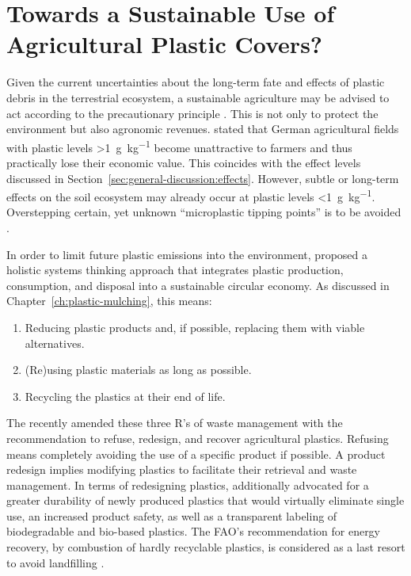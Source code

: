 \section{Towards a Sustainable Use of Agricultural Plastic Covers?}
\label{sec:general-discussion:sustainable}

Given the current uncertainties about the long-term fate and effects of plastic debris in the terrestrial ecosystem, a sustainable agriculture may be advised to act according to the precautionary principle \citep{RhodesPlastic2018,BackhausMicroplastics2020,MollerFinding2020}. This is not only to protect the environment but also agronomic revenues.  stated that German agricultural fields with plastic levels \SI{>1}{\gram\per\kilo\gram} become unattractive to farmers and thus practically lose their economic value. This coincides with the effect levels discussed in Section~\ref{sec:general-discussion:effects}. However, subtle or long-term effects on the soil ecosystem may already occur at plastic levels \SI{<1}{\gram\per\kilo\gram}. Overstepping certain, yet unknown ``microplastic tipping points'' is to be avoided \citep{QiBehavior2020}.

In order to limit future plastic emissions into the environment, \citet{ThompsonPlastics2009,ScalengheResource2018,RhodesPlastic2018} proposed a holistic systems thinking approach that integrates plastic production, consumption, and disposal into a sustainable circular economy. As discussed in Chapter~\ref{ch:plastic-mulching}, this means:
\begin{enumerate}
	\item Reducing plastic products and, if possible, replacing them with viable alternatives.
	\item (Re)using plastic materials as long as possible.
	\item Recycling the plastics at their end of life.
\end{enumerate}

The \citet{FAOAssessment2021} recently amended these three R's of waste management with the recommendation to refuse, redesign, and recover agricultural plastics. Refusing means completely avoiding the use of a specific product if possible. A product redesign implies modifying plastics to facilitate their retrieval and waste management. In terms of redesigning plastics, \citet{SimonBinding2021} additionally advocated for a greater durability of newly produced plastics that would virtually eliminate single use, an increased product safety, as well as a transparent labeling of biodegradable and bio-based plastics. The FAO's recommendation for energy recovery, by combustion of hardly recyclable plastics, is considered as a last resort to avoid landfilling \citep{FAOAssessment2021}.

